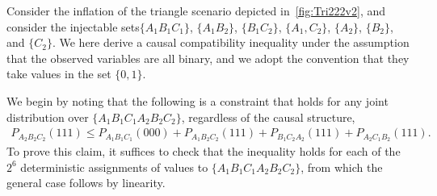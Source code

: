 \bigskip

\smallskip\nobreak



Consider the inflation of the triangle scenario depicted in~\cref{fig:Tri222v2}, and consider the injectable sets$\{A_1 B_1 C_1\}$, $\{A_1 B_2\}$, $\{B_1 C_2\}$, $\{ A_1, C_2\}$, $\{A_2\}$, $\{B_2\}$, and $\{C_2\}$.
We here derive a causal compatibility inequality under the assumption that the observed variables are all binary, and we adopt the convention that they take values in the set $\{0,1\}$.

We begin by noting that the following is a constraint that holds for any joint distribution over $\{A_1 B_1 C_1 A_2 B_2 C_2\}$, regardless of the causal structure, 
\begin{align}\label{eq:FritzF3raw}
	P_{A_2 B_2 C_2}(111) \leq P_{A_1 B_1 C_1}(000) + P_{A_1 B_2 C_2}(111) + P_{B_1 C_2 A_2}(111) + P_{A_2  C_1 B_2}(111).
\end{align}
To prove this claim, it suffices to check that the inequality holds for each of the $2^6$ deterministic assignments of values to $\{A_1 B_1 C_1 A_2 B_2 C_2\}$, from which the general case follows by linearity. %

